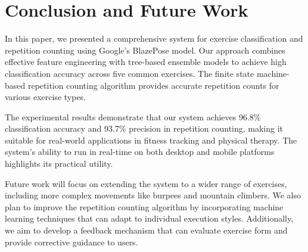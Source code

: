 \documentclass[conference]{IEEEtran}
\begin{document}
\section{Conclusion and Future Work}
In this paper, we presented a comprehensive system for exercise classification and repetition counting using Google's BlazePose model. Our approach combines effective feature engineering with tree-based ensemble models to achieve high classification accuracy across five common exercises. The finite state machine-based repetition counting algorithm provides accurate repetition counts for various exercise types.

The experimental results demonstrate that our system achieves 96.8\% classification accuracy and 93.7\% precision in repetition counting, making it suitable for real-world applications in fitness tracking and physical therapy. The system's ability to run in real-time on both desktop and mobile platforms highlights its practical utility.

Future work will focus on extending the system to a wider range of exercises, including more complex movements like burpees and mountain climbers. We also plan to improve the repetition counting algorithm by incorporating machine learning techniques that can adapt to individual execution styles. Additionally, we aim to develop a feedback mechanism that can evaluate exercise form and provide corrective guidance to users.
\end{document}
